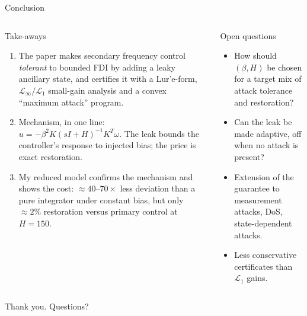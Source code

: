 \documentclass[aspectratio=169,9pt]{beamer}
\newcommand{\Linf}{\mathcal{L}_\infty}
\newcommand{\Lone}{\mathcal{L}_1}
\begin{document}
\begin{frame}[t]{Conclusion}
\footnotesize
\begin{columns}[T]
\begin{block}{Take-aways}
\begin{enumerate}
\item The paper makes secondary frequency control \emph{tolerant} to bounded FDI by adding a leaky ancillary state, and certifies it with a Lur'e-form, $\Linf/\Lone$ small-gain analysis and a convex ``maximum attack'' program.
\item Mechanism, in one line: $u=-\beta^2K(sI+H)^{-1}K^T\omega$. The leak bounds the controller's response to injected bias; the price is exact restoration.
\item My reduced model confirms the mechanism and shows the cost: $\approx40$--$70\times$ less deviation than a pure integrator under constant bias, but only $\approx2\%$ restoration versus primary control at $H=150$.
\end{enumerate}
\end{block}
\begin{alertblock}{Open questions}
\begin{itemize}
\item How should $(\beta,H)$ be chosen for a target mix of attack tolerance and restoration?
\item Can the leak be made adaptive, off when no attack is present?
\item Extension of the guarantee to measurement attacks, DoS, state-dependent attacks.
\item Less conservative certificates than $\Lone$ gains.
\end{itemize}
\end{alertblock}
\end{columns}
\vspace{0.2cm}
\centering\Large Thank you. Questions?
\end{frame}

\appendix
\end{document}
